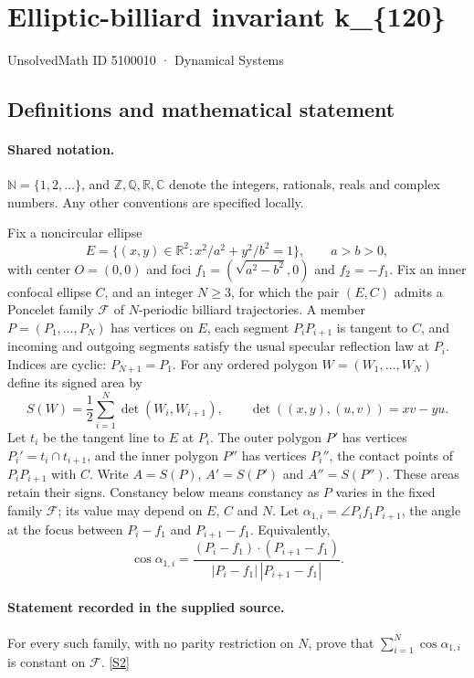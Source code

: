 \documentclass[11pt]{article}
\newcommand{\sref}[2]{\hyperlink{source:#1:#2}{[S#2]}}
\begin{document}
\setcounter{section}{5100009}
\section{Elliptic-billiard invariant k\_\{120\}}\label{5100010}
{\small\sffamily UnsolvedMath ID 5100010 · Dynamical Systems}
\subsection{Definitions and mathematical statement}

\paragraph{Shared notation.}$\mathbb N=\{1,2,\ldots\}$, and $\mathbb Z,\mathbb Q,\mathbb R,\mathbb C$ denote the integers, rationals, reals and complex numbers. Any other conventions are specified locally.


Fix a noncircular ellipse
\[
E=\{(x,y)\in\mathbb R^2:x^2/a^2+y^2/b^2=1\},\qquad a>b>0,
\]
with center $O=(0,0)$ and foci $f_1=(\sqrt{a^2-b^2},0)$ and $f_2=-f_1$. Fix an inner confocal ellipse $C$, and an integer $N\geq3$, for which the pair $(E,C)$ admits a Poncelet family $\mathcal F$ of $N$-periodic billiard trajectories. A member $P=(P_1,\ldots,P_N)$ has vertices on $E$, each segment $P_iP_{i+1}$ is tangent to $C$, and incoming and outgoing segments satisfy the usual specular reflection law at $P_i$. Indices are cyclic: $P_{N+1}=P_1$.
For any ordered polygon $W=(W_1,\ldots,W_N)$ define its signed area by
\[
S(W)=\frac12\sum_{i=1}^N\det(W_i,W_{i+1}),\qquad
\det((x,y),(u,v))=xv-yu.
\]
Let $t_i$ be the tangent line to $E$ at $P_i$. The outer polygon $P'$ has vertices $P_i'=t_i\cap t_{i+1}$, and the inner polygon $P''$ has vertices $P_i''$, the contact points of $P_iP_{i+1}$ with $C$. Write $A=S(P)$, $A'=S(P')$ and $A''=S(P'')$. These areas retain their signs. Constancy below means constancy as $P$ varies in the fixed family $\mathcal F$; its value may depend on $E$, $C$ and $N$.
Let $\alpha_{1,i}=\angle P_i f_1 P_{i+1}$, the angle at the focus between $P_i-f_1$ and $P_{i+1}-f_1$. Equivalently,
\[
\cos\alpha_{1,i}=\frac{(P_i-f_1)\cdot(P_{i+1}-f_1)}{|P_i-f_1|\,|P_{i+1}-f_1|}.
\]
\paragraph{Statement recorded in the supplied source.}
For every such family, with no parity restriction on $N$, prove that $\displaystyle\sum_{i=1}^N\cos\alpha_{1,i}$ is constant on $\mathcal F$. \sref{5100010}{2}
\end{document}
